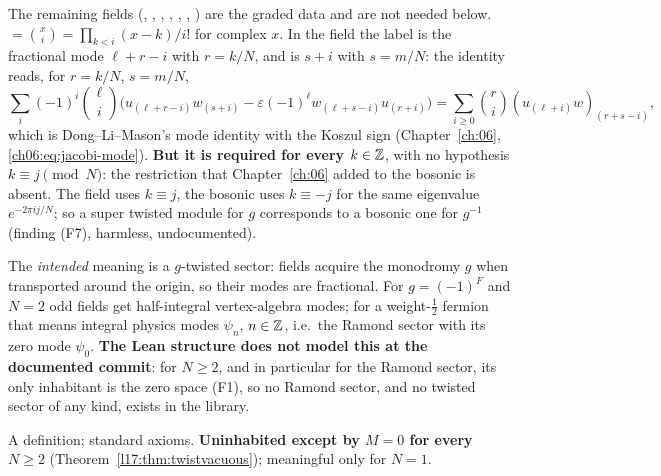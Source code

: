 \begin{dictionary}
The remaining fields (, , , ,
, , ) are the graded data and are not needed
below.  $=\binom xi=\prod_{k<i}(x-k)/i!$ for complex $x$. In the
 field the label  is the fractional mode $\ell+r-i$ with
$r=k/N$, and  is $s+i$ with $s=m/N$: the identity reads, for $r=k/N$, $s=m/N$,
\begin{equation*}
\sum_i(-1)^i\binom\ell i\bigl(u_{(\ell+r-i)}w_{(s+i)}-\varepsilon(-1)^\ell w_{(\ell+s-i)}u_{(r+i)}\bigr)
=\sum_{i\ge0}\binom ri(u_{(\ell+i)}w)_{(r+s-i)} ,
\end{equation*}
which is Dong--Li--Mason's mode identity with the Koszul sign (Chapter~\ref{ch:06},
\eqref{ch06:eq:jacobi-mode}). \textbf{But it is required for every $k\in{\mathbb{Z}}$}, with no hypothesis
$k\equiv j\pmod N$: the restriction that Chapter~\ref{ch:06} added to the bosonic
 is absent. The  field uses $k\equiv j$, the bosonic
 uses $k\equiv-j$ for the same eigenvalue $e^{-2\pi ij/N}$; so a super twisted
module for $g$ corresponds to a bosonic one for $g^{-1}$ (finding (F7), harmless, undocumented).
\end{dictionary}
\begin{physics}
The \emph{intended} meaning is a $g$-twisted sector: fields acquire the monodromy $g$ when transported
around the origin, so their modes are fractional. For $g=(-1)^F$ and $N=2$ odd fields get
half-integral vertex-algebra modes; for a weight-$\frac12$ fermion that means integral physics modes
$\psi_n$, $n\in{\mathbb{Z}}$, i.e.\ the Ramond sector with its zero mode $\psi_0$. \textbf{The Lean structure
does not model this at the documented commit}: for $N\ge2$, and in particular for the Ramond sector,
its only inhabitant is the zero space (F1), so no Ramond sector, and no twisted sector of any kind,
exists in the library.
\end{physics}
\begin{status}
A definition; standard axioms. \textbf{Uninhabited except by $M=0$ for every $N\ge2$}
(Theorem~\ref{l17:thm:twistvacuous});
meaningful only for $N=1$.
\end{status}

